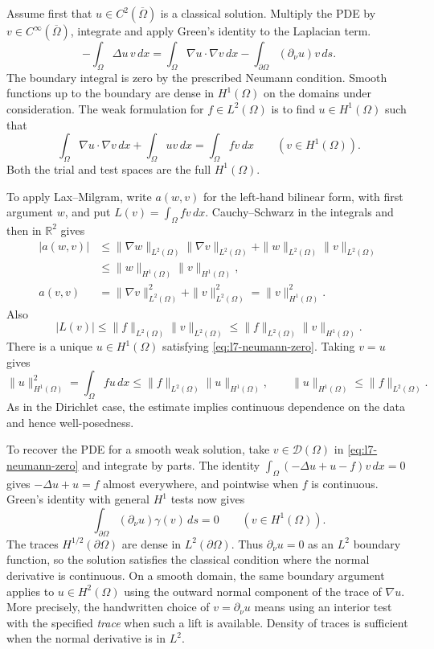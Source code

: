 \documentclass[11pt,a4paper]{article}
\begin{document}
Assume first that \(u\in C^2(\overline\Omega)\) is a classical
solution. Multiply the PDE by \(v\in C^\infty(\overline\Omega)\),
integrate and apply Green's identity to the Laplacian term.
\[
  -\int_\Omega\Delta u\,v\,dx
  =\int_\Omega\nabla u\cdot\nabla v\,dx
     -\int_{\partial\Omega}(\partial_\nu u)v\,ds.
\]
The boundary integral is zero by the prescribed Neumann
condition. Smooth functions up to the boundary are dense
in \(H^1(\Omega)\) on the domains under consideration.
The weak formulation for \(f\in L^2(\Omega)\) is to find
\(u\in H^1(\Omega)\) such that
\begin{equation}
  \int_\Omega\nabla u\cdot\nabla v\,dx+\int_\Omega uv\,dx
  =\int_\Omega f v\,dx\qquad(v\in H^1(\Omega)).
  \label{eq:l7-neumann-zero}
\end{equation}
Both the trial and test spaces are the full \(H^1(\Omega)\).

To apply Lax--Milgram, write \(a(w,v)\) for the left-hand
bilinear form, with first argument \(w\), and put
\(L(v)=\int_\Omega f v\,dx\). Cauchy--Schwarz in the integrals
and then in \(\mathbb R^2\) gives
\begin{align*}
  |a(w,v)|
  &\le\|\nabla w\|_{L^2(\Omega)}\|\nabla v\|_{L^2(\Omega)}
      +\|w\|_{L^2(\Omega)}\|v\|_{L^2(\Omega)}\\
  &\le\|w\|_{H^1(\Omega)}\|v\|_{H^1(\Omega)},\\
  a(v,v)&=\|\nabla v\|_{L^2(\Omega)}^2+\|v\|_{L^2(\Omega)}^2
         =\|v\|_{H^1(\Omega)}^2 .
\end{align*}
Also
\[
  |L(v)|\le\|f\|_{L^2(\Omega)}\|v\|_{L^2(\Omega)}
          \le\|f\|_{L^2(\Omega)}\|v\|_{H^1(\Omega)}.
\]
There is a unique \(u\in H^1(\Omega)\) satisfying
\eqref{eq:l7-neumann-zero}. Taking \(v=u\) gives
\[
  \|u\|_{H^1(\Omega)}^2=\int_\Omega f u\,dx
      \le \|f\|_{L^2(\Omega)}\|u\|_{H^1(\Omega)},
  \qquad
  \|u\|_{H^1(\Omega)}\le\|f\|_{L^2(\Omega)}.
\]
As in the Dirichlet case, the estimate implies continuous
dependence on the data and hence well-posedness.

To recover the PDE for a smooth weak solution, take
\(v\in\mathcal D(\Omega)\) in \eqref{eq:l7-neumann-zero} and
integrate by parts. The identity
\(\int_\Omega(-\Delta u+u-f)v\,dx=0\) gives
\(-\Delta u+u=f\) almost everywhere, and pointwise when
\(f\) is continuous. Green's identity with general \(H^1\)
tests now gives
\[
  \int_{\partial\Omega}(\partial_\nu u)\gamma(v)\,ds=0
    \qquad(v\in H^1(\Omega)).
\]
The traces \(H^{1/2}(\partial\Omega)\) are dense in
\(L^2(\partial\Omega)\). Thus \(\partial_\nu u=0\) as an
\(L^2\) boundary function, so the solution satisfies the
classical condition where the normal derivative is continuous.
On a smooth domain, the same boundary argument applies to
\(u\in H^2(\Omega)\) using the outward normal component of
the trace of \(\nabla u\). More precisely, the handwritten choice of
\(v=\partial_\nu u\) means using an interior test with the
specified \emph{trace} when such a lift is available. Density
of traces is sufficient when the normal derivative is in \(L^2\).
\end{document}
